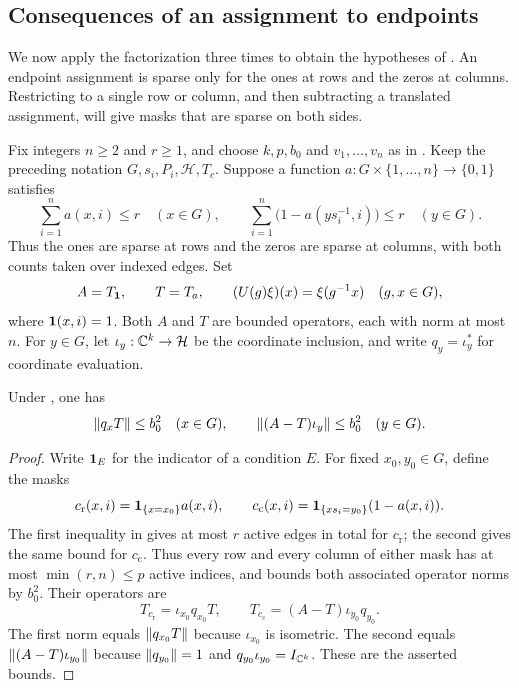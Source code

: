 \subsection{Consequences of an assignment to endpoints}

We now apply the factorization three times to obtain the hypotheses of
. An endpoint assignment is sparse
only for the ones at rows and the zeros at columns. Restricting to a
single row or column, and then subtracting a translated assignment,
will give masks that are sparse on both sides.

Fix integers $n\ge2$ and $r\ge1$, and choose $k,p,b_0$ and
$v_1,\ldots,v_n$ as in .  Keep the preceding
notation $G,s_i,P_i,\mathcal H,T_c$.  Suppose a function
$a\colon G\times\{1,\ldots,n\}\to\{0,1\}$ satisfies
\begin{equation}
\label{eq:weights-orientation-bounds}
 \sum_{i=1}^n a(x,i)\le r\quad(x\in G),
 \qquad
 \sum_{i=1}^n\bigl(1-a(ys_i^{-1},i)\bigr)\le r\quad(y\in G).
\end{equation}
Thus the ones are sparse at rows and the zeros are sparse at columns,
with both counts taken over indexed edges.  Set
\begin{equation}
\label{eq:weights-A-T-U}
 A=T_{\mathbf 1},\qquad T=T_a,\qquad
 (U(g)\xi)(x)=\xi(g^{-1}x)\quad(g,x\in G),
\end{equation}
where $\mathbf 1(x,i)=1$.  Both $A$ and $T$ are bounded operators, each
with norm at most $n$. For $y\in G$, let
$\iota_y:\mathbb C^k\to\mathcal H$ be the coordinate inclusion, and write
$q_y=\iota_y^*$ for coordinate evaluation.

\begin{corollary}
\label{cor:block-rows-columns}
Under , one has
\[
 \left\lVert q_xT\right\rVert\le b_0^2\quad(x\in G),
 \qquad
 \left\lVert(A-T)\iota_y\right\rVert\le b_0^2\quad(y\in G).
\]
\end{corollary}

\begin{proof}
Write $\mathbf 1_E$ for the indicator of a condition $E$.
For fixed $x_0,y_0\in G$, define the masks
\[
 c_{\mathrm r}(x,i)=\mathbf 1_{\{x=x_0\}}a(x,i),\qquad
 c_{\mathrm c}(x,i)=\mathbf 1_{\{xs_i=y_0\}}(1-a(x,i)).
\]
The first inequality in  gives
at most $r$ active edges in total for $c_{\mathrm r}$; the second
gives the same bound for $c_{\mathrm c}$.
Thus every row and every column of either mask has at most
$\min(r,n)\le p$ active indices, and  bounds both
associated operator norms by $b_0^2$. Their operators are
\[
 T_{c_{\mathrm r}}=\iota_{x_0}q_{x_0}T,\qquad
 T_{c_{\mathrm c}}=(A-T)\iota_{y_0}q_{y_0}.
\]
The first norm equals $\left\lVert q_{x_0}T\right\rVert$ because $\iota_{x_0}$ is
isometric. The second equals $\left\lVert(A-T)\iota_{y_0}\right\rVert$ because
$\left\lVert q_{y_0}\right\rVert=1$ and $q_{y_0}\iota_{y_0}=I_{\mathbb C^k}$.
These are the asserted bounds.
\end{proof}

